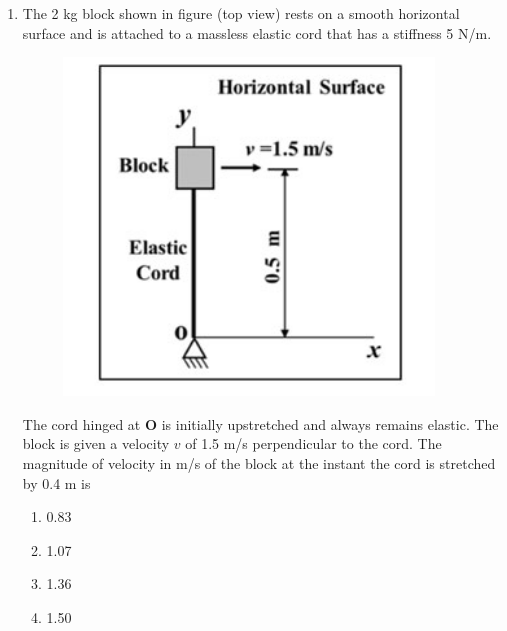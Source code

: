 \documentclass[12pt,onecolumn]{article}
\begin{document}
\begin{enumerate}
    \item The 2 kg block shown in figure (top view) rests on a smooth horizontal surface and is attached to a massless elastic cord that has a stiffness 5 N/m.
          \begin{figure}[H]
              \centering
              \includegraphics[scale=0.5]{q29}
              \label{fig:q29}
          \end{figure}
          The cord hinged at \textbf{O} is initially upstretched and always remains elastic. The block is given a velocity $v$ of 1.5 m/s perpendicular to the cord. The magnitude of velocity in m/s of the block at the instant the cord is stretched by 0.4 m is
          \begin{enumerate}
              \item 0.83
              \item 1.07
              \item 1.36
              \item 1.50
          \end{enumerate}


\end{enumerate}
\end{document}
